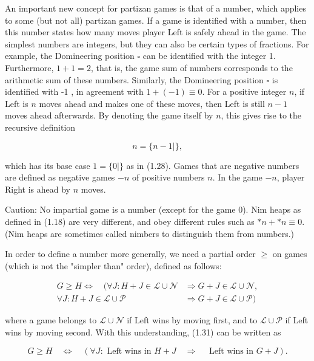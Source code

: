\documentclass[12pt]{article}
\begin{document}
An important new concept for partizan games is that of a number, which applies to some (but not all) partizan games. If a game is identified with a number, then this number states how many moves player Left is safely ahead in the game. The simplest numbers are integers, but they can also be certain types of fractions. For example, the Domineering position $\square$ can be identified with the integer 1. Furthermore, $1+1=2$, that is, the game sum of numbers corresponds to the arithmetic sum of these numbers. Similarly, the Domineering position $\square$ is identified with -1 , in agreement with $1+(-1) \equiv 0$. For a positive integer $n$, if Left is $n$ moves ahead and makes one of these moves, then Left is still $n-1$ moves ahead afterwards. By denoting the game itself by $n$, this gives rise to the recursive definition


\begin{equation*}
n=\{n-1 \mid\}, \tag{1.30}
\end{equation*}


which has its base case $1=\{0 \mid\}$ as in (1.28). Games that are negative numbers are defined as negative games $-n$ of positive numbers $n$. In the game $-n$, player Right is ahead by $n$ moves.

Caution: No impartial game is a number (except for the game 0). Nim heaps as defined in (1.18) are very different, and obey different rules such as $* n+* n \equiv 0$. (Nim heaps are sometimes called nimbers to distinguish them from numbers.)

In order to define a number more generally, we need a partial order $\geq$ on games (which is not the "simpler than" order), defined as follows:


\begin{align*}
G \geq H \Leftrightarrow \quad(\forall J: H+J \in \mathcal{L} \cup \mathcal{N} & \Rightarrow G+J \in \mathcal{L} \cup \mathcal{N},  \tag{1.31}\\
\forall J: H+J \in \mathcal{L} \cup \mathcal{P} & \Rightarrow G+J \in \mathcal{L} \cup \mathcal{P})
\end{align*}


where a game belongs to $\mathcal{L} \cup \mathcal{N}$ if Left wins by moving first, and to $\mathcal{L} \cup \mathcal{P}$ if Left wins by moving second. With this understanding, (1.31) can be written as

$$
G \geq H \quad \Leftrightarrow \quad(\forall J: \text { Left wins in } H+J \quad \Rightarrow \quad \text { Left wins in } G+J) .
$$
\end{document}

